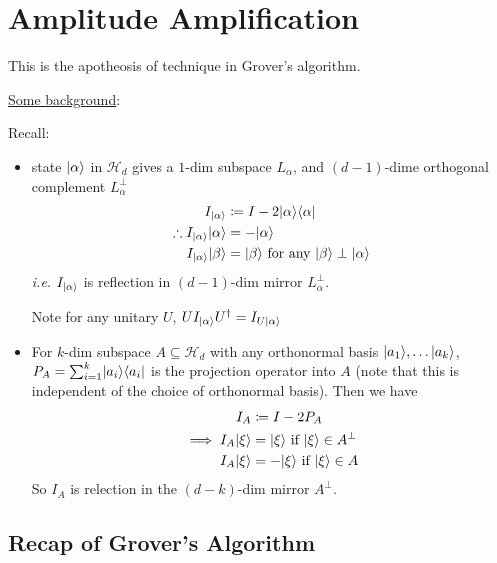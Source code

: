 \documentclass[]{article}
\begin{document}
\section{Amplitude Amplification}

	This is the apotheosis of technique in Grover's algorithm.

	\underline{Some background}:

	\begin{remark*} Recall:
		\begin{itemize}
			\item state $\lvert\alpha\rangle$ in $\mathcal{H}_d$ gives a $1$-dim subspace $L_\alpha$, and $(d-1)$-dime orthogonal complement $L_\alpha^{\perp}$
			\begin{align*}
				I_{\ket{\alpha}} &\coloneqq I - 2\ket{\alpha}\bra{\alpha}\\
				\therefore I_{\ket{\alpha}}\ket{\alpha} &= - \ket{\alpha}\\
				I_{\ket{\alpha}}\ket{\beta} &= \ket{\beta}\ \textrm{for any }\ket{\beta}\perp\ket{\alpha}
			\end{align*}
			\textit{i.e.} $I_{\lvert\alpha\rangle}$ is reflection in $(d-1)$-dim mirror $L_\alpha^\perp$.

			Note for any unitary $U$, $UI_{\lvert\alpha\rangle}U^\dagger = I_{U\lvert\alpha\rangle}$

			\item For $k$-dim subspace $A\subseteq \mathcal{H}_d$ with any orthonormal basis $\lvert a_1\rangle,\dots \lvert a_k\rangle$, $P_A = \sum_{i=1}^{k} \lvert a_i\rangle\langle a_i\rvert$ is the projection operator into $A$ (note that this is independent of the choice of orthonormal basis). Then we have
			\begin{align*}
				I_A &\coloneqq I - 2P_A\\
				\implies I_A\lvert\xi\rangle &= \lvert\xi\rangle\textrm{ if }\lvert\xi\rangle\in A^{\perp}\\
				I_A\lvert\xi\rangle &= -\lvert\xi\rangle\textrm{ if }\lvert\xi\rangle\in A
			\end{align*}
			So $I_A$ is relection in the $(d-k)$-dim mirror $A^\perp$.
		\end{itemize}
	\end{remark*}

\subsection*{Recap of Grover's Algorithm}
\end{document}
